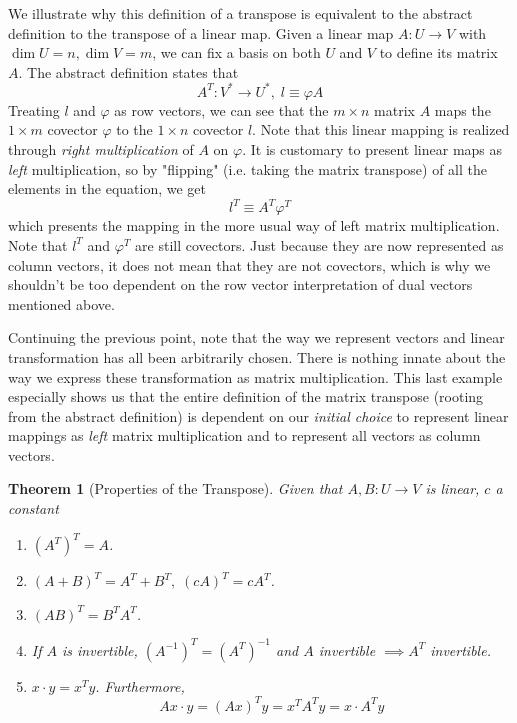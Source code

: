 \documentclass{article}
\newtheorem{theorem}{Theorem}[section]
\theoremstyle{remark}
\theoremstyle{definition}
\begin{document}
We illustrate why this definition of a transpose is equivalent to the abstract definition to the transpose of a linear map. Given a linear map $A: U \longrightarrow V$ with $\dim U = n, \dim V = m$, we can fix a basis on both $U$ and $V$ to define its matrix $A$. The abstract definition states that 
\[ A^T: V^* \longrightarrow U^*, \; l \equiv \varphi A\]
Treating $l$ and $\varphi$ as row vectors, we can see that the $m \times n$ matrix $A$ maps the $1 \times m$ covector $\varphi$ to the $1 \times n$ covector $l$. Note that this linear mapping is realized through \textit{right multiplication} of $A$ on $\varphi$. It is customary to present linear maps as \textit{left} multiplication, so by "flipping" (i.e. taking the matrix transpose) of all the elements in the equation, we get 
\[ l^T \equiv A^T \varphi^T \]
which presents the mapping in the more usual way of left matrix multiplication. Note that $l^T$ and $\varphi^T$ are still covectors. Just because they are now represented as column vectors, it does not mean that they are not covectors, which is why we shouldn't be too dependent on the row vector interpretation of dual vectors mentioned above.  

Continuing the previous point, note that the way we represent vectors and linear transformation has all been arbitrarily chosen. There is nothing innate about the way we express these transformation as matrix multiplication. This last example especially shows us that the entire definition of the matrix transpose (rooting from the abstract definition) is dependent on our \textit{initial choice} to represent linear mappings as \textit{left} matrix multiplication and to represent all vectors as column vectors. 

\begin{theorem}[Properties of the Transpose]
Given that $A, B: U \longrightarrow V$ is linear, $c$ a constant
\begin{enumerate}
    \item $(A^T)^T = A$. 
    \item $(A+B)^T = A^T + B^T, \; (c A)^T = c A^T$. 
    \item $(A B)^T = B^T A^T$. 
    \item If $A$ is invertible, $(A^{-1})^T = (A^T)^{-1}$ and $A$ invertible $\implies A^T$ invertible. 
    \item $x \cdot y = x^T y$. Furthermore, 
\[Ax \cdot y = (A x)^T y = x^T A^T y = x \cdot A^T y\]
\end{enumerate}
\end{theorem}
\end{document}
